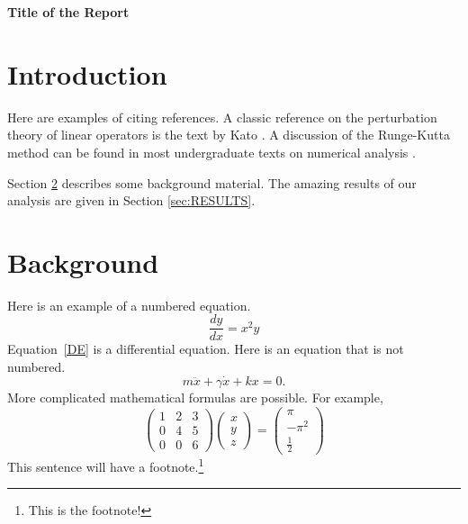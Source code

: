 \documentclass[11pt]{article}
\begin{document}
\centerline{\textbf{\Large Title of the Report}}

\section{Introduction}

Here are examples of citing references. A classic reference on the
perturbation theory of linear operators is the text by Kato \cite{KATO}.
A discussion of the Runge-Kutta method can be found in most undergraduate
texts on numerical analysis \cite{BF,MF}.

Section \ref{sec:BG} describes some background material.
The amazing results of our analysis are given in Section \ref{sec:RESULTS}.

\section{Background}
\label{sec:BG}

Here is an example of a numbered equation.
\begin{equation}
\frac{dy}{dx} = x^2y
\label{DE}
\end{equation}
Equation~\eqref{DE} is a differential equation.
Here is an equation that is not numbered.
\[
   m\ddot{x} + \gamma \dot{x} + k x = 0.
\]
More complicated mathematical formulas are possible.
For example,
\[
\begin{pmatrix}
    1 & 2 & 3 \\
    0 & 4 & 5 \\
    0 & 0 & 6
\end{pmatrix}
\begin{pmatrix}
    x \\
    y \\
    z
\end{pmatrix}
  = \begin{pmatrix}
        \pi \\
        -\pi^2 \\
        \frac{1}{2}
     \end{pmatrix}
\]
This sentence will have a footnote.\footnote{This is the footnote!}
\end{document}
